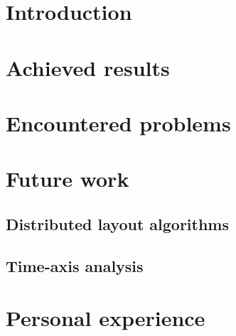 
\section{Introduction}

\section{Achieved results}

\section{Encountered problems}

\section{Future work}
\subsection{Distributed layout algorithms}
\subsection{Time-axis analysis}

\section{Personal experience}
